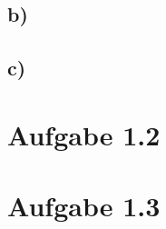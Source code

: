 \documentclass[a4paper,11pt]{scrartcl}
\begin{document}
	\subsection*{b)}
	\subsection*{c)}
	
	\section*{Aufgabe 1.2}
	\section*{Aufgabe 1.3}
	
	
	
\end{document}
